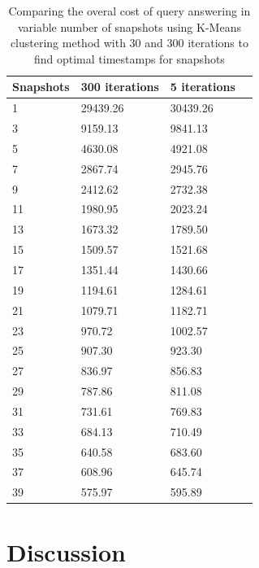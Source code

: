 \begin {center}
\begin{table}
	\centering
	\caption{Comparing the overal cost of query answering in variable number of snapshots using K-Means clustering method with 30 and 300 iterations to find optimal timestamps for snapshots}
	\label {table:compare_clustring_iterations}
	\begin{tabular}{p{2cm}p{3cm}p{3cm}p{3cm}}
		\hline
		Snapshots  & 300 iterations  & 5 iterations \\ \hline
		1 & 29439.26 & 30439.26 \\  
		3 & 9159.13  & 9841.13\\
		5 & 4630.08  & 4921.08\\
		7 & 2867.74  & 2945.76\\
		9 & 2412.62  & 2732.38\\
		11 & 1980.95  & 2023.24\\
		13 & 1673.32  & 1789.50\\
		15 & 1509.57  & 1521.68\\
		17 & 1351.44  & 1430.66\\
		19 & 1194.61  & 1284.61\\
		21 & 1079.71  & 1182.71\\
		23 & 970.72  & 1002.57\\
		25 & 907.30  & 923.30\\
		27 & 836.97  & 856.83\\
		29 & 787.86  & 811.08\\
		31 & 731.61  & 769.83\\
		33 & 684.13  & 710.49\\
		35 & 640.58  & 683.60\\
		37 & 608.96  & 645.74\\
		39 & 575.97  & 595.89\\\hline
	\end{tabular}
\end{table}
\end{center}

\section{Discussion}
